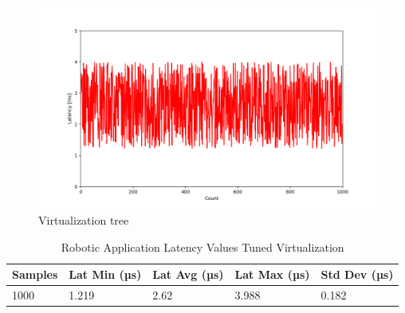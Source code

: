 \documentclass[MMR,Master,english]{twbook}
\begin{document}
\begin{figure}[H]
	\centering
	\includegraphics[width=1.0\columnwidth]{masterthesis-documentation/docs/resources/scripts/experiment/generated_latencies/tuned_virt_latencies.png}
	\caption[Virtualization tree]{Virtualization tree}
	\label{fig:tuned_virt_latencies}
\end{figure}
\begin{table}[H]
	\centering
	\caption{Robotic Application Latency Values Tuned Virtualization}
	\label{tab:robotic_application_latency_values_virt_tun}
	\setlength{\tabcolsep}{0.5em} %
	{\renewcommand{\arraystretch}{1.2}%
		\begin{tabular}{|l|l|l|l|l|}
			\hline
			\textbf{Samples} & \textbf{Lat Min (µs)} & \textbf{Lat Avg (µs)} & \textbf{Lat Max (µs)} & \textbf{Std Dev (µs)} \\ \hline
			1000             & 1.219                 & 2.62                  & 3.988            & 0.182                   \\ \hline
		\end{tabular}}
\end{table}

\clearpage
\end{document}
